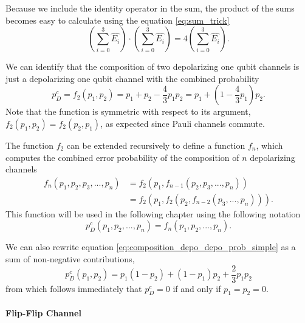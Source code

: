 Because we include the identity operator in the sum, the product of the sums becomes easy to calculate using the equation \eqref{eq:sum_trick} 
\begin{equation*}
    \left( \sum_{i=0}^{3} \hat{E_i}\right) \cdot \left( \sum_{i=0}^{3} \hat{E_i}\right) = 4 \left( \sum_{i=0}^{3} \hat{E_i}\right) .
\end{equation*}

We can identify that the composition of two depolarizing one qubit channels 
is just a depolarizing one qubit channel with the combined probability 
\begin{equation}
    p^c_D = f_{2}(p_1,p_2) = p_1 + p_2 - \frac{4}{3}p_1 p_2 = p_1 + (1- \frac{4}{3}p_1) p_2.
    \label{eq:composition_depo_depo_prob_simple}
\end{equation}
Note that the function is symmetric with respect to its argument, $f_{2}(p_1,p_2)=f_{2}(p_2,p_1)$, 
as expected since Pauli channels commute. 

The function $f_2$ can be extended recursively to define a function $f_n$, which computes the combined error probability of the composition of $n$ depolarizing channels
\begin{align*}
    f_{n}(p_1,p_2,p_3,...,p_n) &= f_{2}\left(p_1,f_{n-1}(p_2,p_3,...,p_n)\right) \\
    &= f_{2}(p_1,f_{2}(p_2,f_{n-2}(p_3,...,p_n))).
\end{align*} 
This function will be used in the following chapter using the following notation 
\begin{equation}
    p_D^c(p_1,p_2,...,p_n) = f_{n}(p_1,p_2,...,p_n).
    \label{eq:depo_depo_composition}
\end{equation}

We can also rewrite equation \eqref{eq:composition_depo_depo_prob_simple} as a sum of non-negative contributions,
\begin{equation}
    p^c_D(p_1,p_2) = p_1 (1-p_2) + (1-p_1) p_2 + \frac{2}{3} p_1 p_2
    \label{eq:sem_depo_depo_not_negative}
\end{equation}
from which follows immediately that $p^c_D=0$ if and only if $p_1=p_2=0$.


\paragraph*{Flip-Flip Channel}

